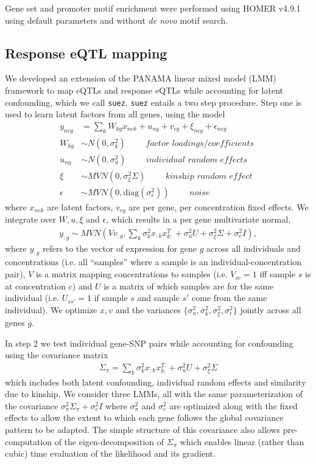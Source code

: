 \documentclass[9pt,lineno]{elife}
\begin{document}
Gene set and promoter motif enrichment were performed using HOMER v4.9.1 \citep{heinz2010simple} using default parameters and without \emph{de novo} motif search. 

\subsection*{Response eQTL mapping} 

We developed an extension of the PANAMA \citep{Fusi2012} linear mixed model (LMM) framework to map eQTLs and response eQTLs while accounting for latent confounding, which we call \texttt{suez}. \texttt{suez} entails a two step procedure. Step one is used to learn latent factors from all genes, using the model
\begin{align*}
y_{ncg} &= \sum_k W_{kg} x_{nck} + u_{ng} + v_{cg} + \xi_{ncg} + \epsilon_{ncg} \\
W_{kg} & \sim N(0, \sigma^2_k ) \qquad \textit{ factor loadings/coefficients } \\ 
u_{ng} &\sim N(0, \sigma^2_u) \qquad \textit{ individual random effects } \\
\xi &\sim MVN(0, \sigma^2_\xi \Sigma ) \qquad \textit{ kinship random effect }  \\
\epsilon &\sim MVN(0, \text{diag}(\sigma^2_\epsilon)) \qquad \textit{ noise } 
\end{align*}
where $x_{nck}$ are latent factors, $v_{cg}$ are per gene, per concentration fixed effects. We integrate over $W, u, \xi$ and $\epsilon$, which results in a per gene multivariate normal,
\begin{align}
y_{:g} \sim MVN\left( V v_{:g} , \sum_k \sigma^2_k x_{:k} x_{k:}^T + \sigma^2_u U + \sigma^2_\xi \Sigma + \sigma^2_e I \right),
\end{align}
where $y_{:g}$ refers to the vector of expression for gene $g$ across all individuals and concentrations (i.e. all ``samples'' where a sample is an individual-concentration pair), $V$ is a matrix mapping concentrations to samples (i.e. $V_{sc}=1$ iff sample $s$ is at concentration $c$) and $U$ is a matrix of which samples are for the same individual (i.e. $U_{ss'}=1$ if sample $s$ and sample $s'$ come from the same individual). We optimize $x,v$ and the variances $\{ \sigma^2_u, \sigma^2_k,  \sigma^2_\xi, \sigma^2_\epsilon \}$ jointly across all genes $g$. 

In step 2 we test individual gene-SNP pairs while accounting for confounding using the covariance matrix 
\begin{align}
 \Sigma_\pi = \sum_k \sigma^2_k x_{:k} x_{k:}^T + \sigma^2_u U + \sigma^2_\xi \Sigma 
 \end{align}
which includes both latent confounding, individual random effects and similarity due to kinship. We consider three LMMs, all with the same parameterization of the covariance $\sigma^2_\pi \Sigma_\pi + \sigma^2_e I$ where $\sigma^2_\pi$ and $\sigma^2_e$ are optimized along with the fixed effects to allow the extent to which each gene follows the global covariance pattern to be adapted. The simple structure of this covariance also allows pre-computation of the eigen-decomposition of $\Sigma_\pi$ which enables linear (rather than cubic) time evaluation of the likelihood and its gradient. 
\end{document}
